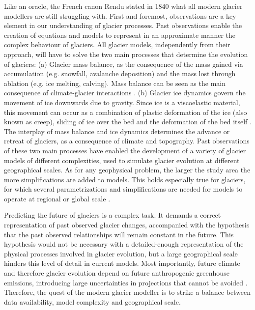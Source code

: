 Like an oracle, the French canon Rendu stated in 1840 what all modern glacier modellers are still struggling with. First and foremost, observations are a key element in our understanding of glacier processes. Past observations enable the creation of equations and models to represent in an approximate manner the complex behaviour of glaciers. All glacier models, independently from their approach, will have to solve the two main processes that determine the evolution of glaciers: (a) Glacier mass balance, as the consequence of the mass gained via accumulation (e.g. snowfall, avalanche deposition) and the mass lost through ablation (e.g. ice melting, calving). Mass balance can be seen as the main consequence of climate-glacier interactions \citep{benn_glaciers_2014}. (b) Glacier ice dynamics govern the movement of ice downwards due to gravity. Since ice is a viscoelastic material, this movement can occur as a combination of plastic deformation of the ice (also known as creep), sliding of ice over the bed and the deformation of the bed itself \citep{cuffey_physics_2010}. The interplay of mass balance and ice dynamics determines the advance or retreat of glaciers, as a consequence of climate and topography. Past observations of these two main processes have enabled the development of a variety of glacier models of different complexities, used to simulate glacier evolution at different geographical scales. As for any geophysical problem, the larger the study area the more simplifications are added to models. This holds especially true for glaciers, for which several parametrizations and simplifications are needed for models to operate at regional or global scale \citep[e.g.][]{marzeion_past_2012, huss_new_2015, maussion_open_2019}. 

Predicting the future of glaciers is a complex task. It demands a correct representation of past observed glacier changes, accompanied with the hypothesis that the past observed relationships will remain constant in the future. This hypothesis would not be necessary with a detailed-enough representation of the physical processes involved in glacier evolution, but a large geographical scale hinders this level of detail in current models. Most importantly, future climate and therefore glacier evolution depend on future anthropogenic greenhouse emissions, introducing large uncertainties in projections that cannot be avoided \citep{marzeion_partitioning_2020}. Therefore, the quest of the modern glacier modeller is to strike a balance between data availability, model complexity and geographical scale.

